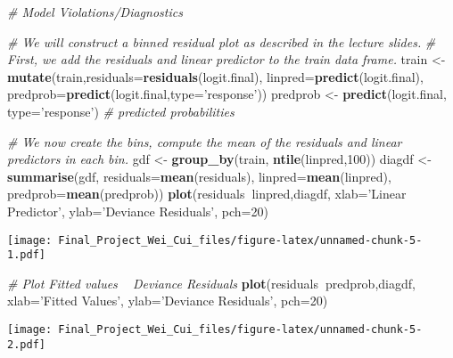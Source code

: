 \documentclass[
]{article}
\newenvironment{Shaded}{\begin{snugshade}}{\end{snugshade}}
\newcommand{\CommentTok}[1]{\textcolor[rgb]{0.56,0.35,0.01}{\textit{#1}}}
\newcommand{\DataTypeTok}[1]{\textcolor[rgb]{0.13,0.29,0.53}{#1}}
\newcommand{\DecValTok}[1]{\textcolor[rgb]{0.00,0.00,0.81}{#1}}
\newcommand{\KeywordTok}[1]{\textcolor[rgb]{0.13,0.29,0.53}{\textbf{#1}}}
\newcommand{\NormalTok}[1]{#1}
\newcommand{\OperatorTok}[1]{\textcolor[rgb]{0.81,0.36,0.00}{\textbf{#1}}}
\newcommand{\StringTok}[1]{\textcolor[rgb]{0.31,0.60,0.02}{#1}}
\begin{document}
\begin{Shaded}
\begin{Highlighting}[]
\CommentTok{# Model Violations/Diagnostics}

\CommentTok{# We will construct a binned residual plot as described in the lecture slides. }
\CommentTok{# First, we add the residuals and linear predictor to the train data frame.}
\NormalTok{train <-}\StringTok{ }\KeywordTok{mutate}\NormalTok{(train,}\DataTypeTok{residuals=}\KeywordTok{residuals}\NormalTok{(logit.final), }\DataTypeTok{linpred=}\KeywordTok{predict}\NormalTok{(logit.final), }\DataTypeTok{predprob=}\KeywordTok{predict}\NormalTok{(logit.final,}\DataTypeTok{type=}\StringTok{'response'}\NormalTok{))}
\NormalTok{predprob <-}\StringTok{ }\KeywordTok{predict}\NormalTok{(logit.final, }\DataTypeTok{type=}\StringTok{'response'}\NormalTok{) }\CommentTok{# predicted probabilities}

\CommentTok{# We now create the bins, compute the mean of the residuals and linear predictors in each bin.}
\NormalTok{gdf <-}\StringTok{ }\KeywordTok{group_by}\NormalTok{(train, }\KeywordTok{ntile}\NormalTok{(linpred,}\DecValTok{100}\NormalTok{)) }
\NormalTok{diagdf <-}\StringTok{ }\KeywordTok{summarise}\NormalTok{(gdf, }\DataTypeTok{residuals=}\KeywordTok{mean}\NormalTok{(residuals), }\DataTypeTok{linpred=}\KeywordTok{mean}\NormalTok{(linpred), }\DataTypeTok{predprob=}\KeywordTok{mean}\NormalTok{(predprob))}
\KeywordTok{plot}\NormalTok{(residuals}\OperatorTok{~}\NormalTok{linpred,diagdf, }\DataTypeTok{xlab=}\StringTok{'Linear Predictor'}\NormalTok{, }\DataTypeTok{ylab=}\StringTok{'Deviance Residuals'}\NormalTok{, }\DataTypeTok{pch=}\DecValTok{20}\NormalTok{)}
\end{Highlighting}
\end{Shaded}

\texttt{[image: Final\_Project\_Wei\_Cui\_files/figure-latex/unnamed-chunk-5-1.pdf]}

\begin{Shaded}
\begin{Highlighting}[]
\CommentTok{# Plot Fitted values ~ Deviance Residuals}
\KeywordTok{plot}\NormalTok{(residuals}\OperatorTok{~}\NormalTok{predprob,diagdf, }\DataTypeTok{xlab=}\StringTok{'Fitted Values'}\NormalTok{, }\DataTypeTok{ylab=}\StringTok{'Deviance Residuals'}\NormalTok{, }\DataTypeTok{pch=}\DecValTok{20}\NormalTok{)}
\end{Highlighting}
\end{Shaded}

\texttt{[image: Final\_Project\_Wei\_Cui\_files/figure-latex/unnamed-chunk-5-2.pdf]}
\end{document}

